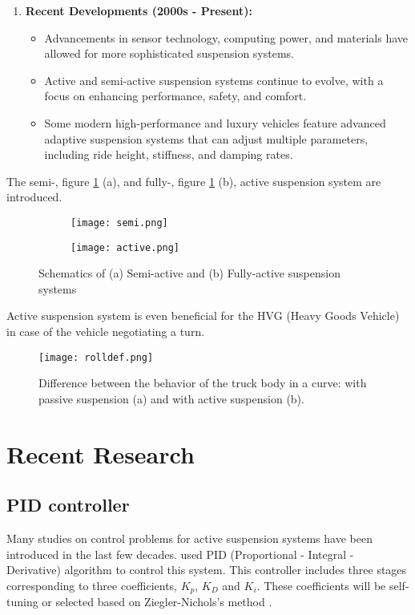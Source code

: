 \begin{enumerate}
	\item \textbf{Recent Developments (2000s - Present):}
	\begin{itemize}
		
		\item Advancements in sensor technology, computing power, and materials have allowed for more sophisticated suspension systems.
		\item Active and semi-active suspension systems continue to evolve, with a focus on enhancing performance, safety, and comfort.
		\item Some modern high-performance and luxury vehicles feature advanced adaptive suspension systems that can adjust multiple parameters, including ride height, stiffness, and damping rates.
	\end{itemize}
\end{enumerate}
The semi-, figure \ref{fig:semi and active} (a), and fully-, figure \ref{fig:semi and active} (b), active suspension system are introduced. \cite{alashtari2023fuzzy}

\begin{figure}[H]
	\centering
	\begin{subfigure}{.35\textwidth}
		\centering
		\texttt{[image: semi.png]}
	\end{subfigure}%
	\begin{subfigure}{.35\textwidth}
		\centering
		\texttt{[image: active.png]}
	\end{subfigure}
	\caption{Schematics of (a) Semi-active and (b) Fully-active suspension systems \cite{wong2001theory}}
	\label{fig:semi and active}
\end{figure}

Active suspension system is even beneficial for the HVG (Heavy Goods Vehicle) in case of the vehicle negotiating a turn.

\begin{figure}[H]
	\centering
	\texttt{[image: rolldef.png]}
	\caption{Difference between the behavior of the truck body in a curve: with passive suspension (a) and with active suspension (b). \cite{hamza2022intelligent}}
	\label{fig:rolldef}
\end{figure}

\section{Recent Research}
\subsection{PID controller}
	Many studies on control problems for active suspension systems have been introduced in the last few decades. \cite{duong2022modeling} used PID (Proportional - Integral - Derivative) algorithm to control this system. This controller includes three stages corresponding to three coefficients, $K_p$, $K_D$ and $K_i$. These coefficients will be self-tuning or selected based on Ziegler-Nichols's method \cite{huba2021making}.

